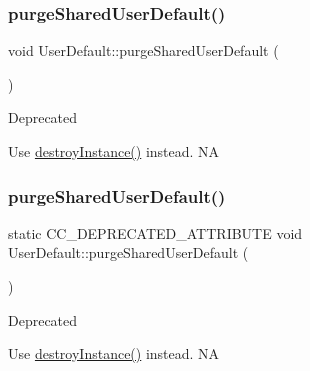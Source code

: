 \subsubsection{\texorpdfstring{purge\+Shared\+User\+Default()}{purgeSharedUserDefault()}\hspace{0.1cm}{\footnotesize\ttfamily [1/2]}}
{\footnotesize\ttfamily void User\+Default\+::purge\+Shared\+User\+Default (\begin{DoxyParamCaption}{ }\end{DoxyParamCaption})\hspace{0.3cm}{\ttfamily [static]}}

\begin{DoxyRefDesc}{Deprecated}
\item[\hyperlink{deprecated__deprecated000061}{Deprecated}]Use \hyperlink{classUserDefault_abaf8b97d4b852484a503eb41e6bfb1ae}{destroy\+Instance()} instead.  NA \end{DoxyRefDesc}
\mbox{\label{classUserDefault_ab697d605b11fa56d21ae2238cd79112c}} 
\subsubsection{\texorpdfstring{purge\+Shared\+User\+Default()}{purgeSharedUserDefault()}\hspace{0.1cm}{\footnotesize\ttfamily [2/2]}}
{\footnotesize\ttfamily static C\+C\+\_\+\+D\+E\+P\+R\+E\+C\+A\+T\+E\+D\+\_\+\+A\+T\+T\+R\+I\+B\+U\+TE void User\+Default\+::purge\+Shared\+User\+Default (\begin{DoxyParamCaption}{ }\end{DoxyParamCaption})\hspace{0.3cm}{\ttfamily [static]}}

\begin{DoxyRefDesc}{Deprecated}
\item[\hyperlink{deprecated__deprecated000296}{Deprecated}]Use \hyperlink{classUserDefault_abaf8b97d4b852484a503eb41e6bfb1ae}{destroy\+Instance()} instead.  NA \end{DoxyRefDesc}
\mbox{\label{classUserDefault_aca71ebb723b249c4c3ab85a5b145a483}} 
